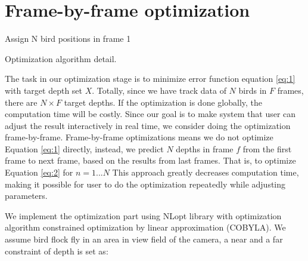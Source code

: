\section{Frame-by-frame optimization}

\begin{algorithm}[h]
\SetAlgoLined
{}
Assign N bird positions in frame 1 \;

\caption{Optimization algorithm detail.}
\label{algo:optimization}
\end{algorithm}



The task in our optimization stage is to minimize error function equation \ref{eq:1} with target depth set $X$. Totally, since we have track data of $N$ birds in $F$ frames, there are $N{\times}F$ target depths. If the optimization is done globally, the computation time will be costly. Since our goal is to make system that user can adjust the result interactively in real time, we consider doing the optimization frame-by-frame. Frame-by-frame optimizations means we do not optimize Equation \ref{eq:1} directly, instead, we predict $N$ depths in frame $f$ from the first frame to next frame, based on the results from last frames. That is, to optimize Equation \ref{eq:2} for $n=1...N$ This approach greatly decreases computation time, making it possible for user to do the optimization repeatedly while adjusting parameters.


We implement the optimization part using NLopt library \cite{NLopt} with optimization algorithm constrained optimization by linear approximation (COBYLA)\cite{COBYLA}. We assume bird flock fly in an area in view field of the camera, a near and a far constraint of depth is set as:


